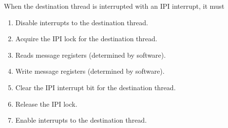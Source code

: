 \documentclass{article}[12pt]
\begin{document}
When the destination thread is interrupted with an IPI
interrupt, it must 
\begin{enumerate}
\item    Disable interrupts to the destination thread.
\item    Acquire the IPI lock for the destination thread.
\item    Reads message registers (determined by software).
\item    Write message registers (determined by software).
\item    Clear the IPI interrupt bit for the destination thread.
\item    Release the IPI lock.
\item    Enable interrupts to the destination thread.
\end{enumerate}
\end{document}
